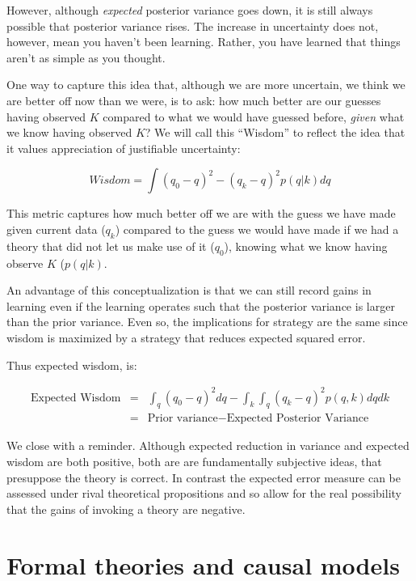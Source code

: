 \documentclass[
  12pt,
]{book}
\begin{document}
However, although \emph{expected} posterior variance goes down, it is still always possible that posterior variance rises. The increase in uncertainty does not, however, mean you haven't been learning. Rather, you have learned that things aren't as simple as you thought.

One way to capture this idea that, although we are more uncertain, we think we are better off now than we were, is to ask: how much better are our guesses having observed \(K\) compared to what we would have guessed before, \emph{given} what we know having observed \(K\)? We will call this ``Wisdom'' to reflect the idea that it values appreciation of justifiable uncertainty:

\[Wisdom  = \int(q_0 - q)^2 - (q_k - q)^2 p(q | k)dq\]

This metric captures how much better off we are with the guess we have made given current data (\(q_k\)) compared to the guess we would have made if we had a theory that did not let us make use of it (\(q_0\)), knowing what we know having observe \(K\) (\(p(q|k)\).

An advantage of this conceptualization is that we can still record gains in learning even if the learning operates such that the posterior variance is larger than the prior variance. Even so, the implications for strategy are the same since wisdom is maximized by a strategy that reduces expected squared error.

Thus expected wisdom, is:

\begin{eqnarray}
\text{Expected Wisdom}  &=& \int_q(q_0 - q)^2dq - \int_k\int_q(q_k - q)^2 p(q, k)dqdk\\
&=& \text{Prior variance} - \text{Expected Posterior Variance}
\end{eqnarray}

We close with a reminder. Although expected reduction in variance and expected wisdom are both positive, both are are fundamentally subjective ideas, that presuppose the theory is correct. In contrast the expected error measure can be assessed under rival theoretical propositions and so allow for the real possibility that the gains of invoking a theory are negative.

\hypertarget{formal-theories-and-causal-models}{%
\section{Formal theories and causal models}\label{formal-theories-and-causal-models}}
\end{document}
